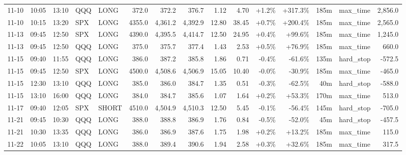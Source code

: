 \documentclass[11pt,a4paper,twoside]{article}
\begin{document}
\begin{landscape}
\begin{center}
\begin{longtable}{>{\color{txtmain}}l l l l l r r r r r r r r >{\color{txtmain}}l r}
11-10 & 10:05 & 13:10 & QQQ & LONG & 372.0 & 372.2 & 376.7 & 1.12 & 4.70 & \textcolor{wingreen}{+1.2\%} & \textcolor{wingreen}{+317.3\%} & 185m & max\_time & \textcolor{wingreen}{2,856.0} \\
11-10 & 10:15 & 13:20 & SPX & LONG & 4355.0 & 4,361.2 & 4,392.9 & 12.80 & 38.45 & \textcolor{wingreen}{+0.7\%} & \textcolor{wingreen}{+200.4\%} & 185m & max\_time & \textcolor{wingreen}{2,565.0} \\
11-13 & 09:45 & 12:50 & SPX & LONG & 4390.0 & 4,395.5 & 4,414.7 & 12.50 & 24.95 & \textcolor{wingreen}{+0.4\%} & \textcolor{wingreen}{+99.6\%} & 185m & max\_time & \textcolor{wingreen}{1,245.0} \\
11-13 & 09:45 & 12:50 & QQQ & LONG & 375.0 & 375.7 & 377.4 & 1.43 & 2.53 & \textcolor{wingreen}{+0.5\%} & \textcolor{wingreen}{+76.9\%} & 185m & max\_time & \textcolor{wingreen}{660.0} \\
11-15 & 09:40 & 11:55 & QQQ & LONG & 386.0 & 387.2 & 385.8 & 1.86 & 0.71 & \textcolor{lossred}{-0.4\%} & \textcolor{lossred}{-61.6\%} & 135m & hard\_stop & \textcolor{lossred}{-572.5} \\
11-15 & 09:45 & 12:50 & SPX & LONG & 4500.0 & 4,508.6 & 4,506.9 & 15.05 & 10.40 & \textcolor{lossred}{-0.0\%} & \textcolor{lossred}{-30.9\%} & 185m & max\_time & \textcolor{lossred}{-465.0} \\
11-15 & 12:30 & 13:10 & QQQ & LONG & 385.0 & 386.0 & 384.7 & 1.35 & 0.51 & \textcolor{lossred}{-0.3\%} & \textcolor{lossred}{-62.5\%} & 40m & hard\_stop & \textcolor{lossred}{-588.0} \\
11-15 & 13:10 & 16:00 & QQQ & LONG & 384.0 & 384.7 & 385.6 & 1.07 & 1.64 & \textcolor{wingreen}{+0.2\%} & \textcolor{wingreen}{+53.3\%} & 170m & max\_time & \textcolor{wingreen}{513.0} \\
11-17 & 09:40 & 12:05 & SPX & SHORT & 4510.0 & 4,504.9 & 4,510.3 & 12.50 & 5.45 & \textcolor{lossred}{-0.1\%} & \textcolor{lossred}{-56.4\%} & 145m & hard\_stop & \textcolor{lossred}{-705.0} \\
11-21 & 09:45 & 10:30 & QQQ & LONG & 388.0 & 388.8 & 386.9 & 1.76 & 0.84 & \textcolor{lossred}{-0.5\%} & \textcolor{lossred}{-52.0\%} & 45m & hard\_stop & \textcolor{lossred}{-457.5} \\
11-21 & 10:30 & 13:35 & QQQ & LONG & 386.0 & 386.9 & 387.6 & 1.75 & 1.98 & \textcolor{wingreen}{+0.2\%} & \textcolor{wingreen}{+13.2\%} & 185m & max\_time & \textcolor{wingreen}{115.0} \\
11-22 & 10:05 & 13:10 & QQQ & LONG & 388.0 & 389.4 & 390.6 & 1.94 & 2.58 & \textcolor{wingreen}{+0.3\%} & \textcolor{wingreen}{+32.6\%} & 185m & max\_time & \textcolor{wingreen}{317.5} \\

\end{longtable}
\end{center}
\end{landscape}
\end{document}
